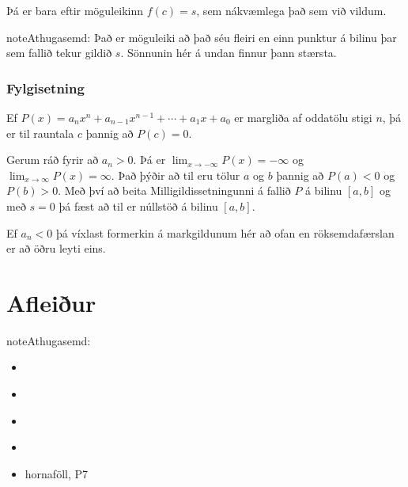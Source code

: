 \documentclass[a4paper,10pt,icelandic]{sphinxmanual}
\begin{document}
Þá er bara eftir möguleikinn \(f(c)=s\), sem nákvæmlega það sem við vildum.

\begin{sphinxadmonition}{note}{Athugasemd:}
Það er möguleiki að það séu fleiri en einn punktur á bilinu þar sem fallið tekur
gildið \(s\). Sönnunin hér á undan finnur þann stærsta.
\end{sphinxadmonition}


\subsection{Fylgisetning}
\label{\detokenize{kafli02:fylgisetning}}
Ef \(P(x)=a_nx^n+a_{n-1}x^{n-1}+\cdots+a_1x+a_0\) er margliða af
oddatölu stigi \(n\), þá er til rauntala \(c\) þannig að \(P(c)=0\).


Gerum ráð fyrir að \(a_n>0\). Þá er
\(\lim_{x\to -\infty} P(x) = -\infty\) og
\(\lim_{x\to \infty} P(x) = \infty\). Það þýðir að til eru tölur
\(a\) og \(b\) þannig að \(P(a)<0\) og \(P(b)>0\). Með
því að beita Milligildissetningunni á fallið \(P\) á bilinu
\([a,b]\) og með \(s=0\) þá fæst að til er núllstöð á bilinu
\([a,b]\).

Ef \(a_n < 0\) þá víxlast formerkin á markgildunum hér að ofan en röksemdafærslan er
að öðru leyti eins.


\chapter{Afleiður}
\label{\detokenize{kafli03:afleiur}}\label{\detokenize{kafli03::doc}}
\begin{sphinxadmonition}{note}{Athugasemd:}
\begin{itemize}
\item {} 
{\hyperref[\detokenize{kafli02:markgildi}]{}}

\item {} 
{\hyperref[\detokenize{kafli02:samfelldni}]{}}

\item {} 
{\hyperref[\detokenize{kafli01:samskeyting}]{}}

\item {} 
{\hyperref[\detokenize{kafli01:andhverfa}]{}}

\item {} 
hornaföll, P7

\end{itemize}
\end{sphinxadmonition}
\end{document}
